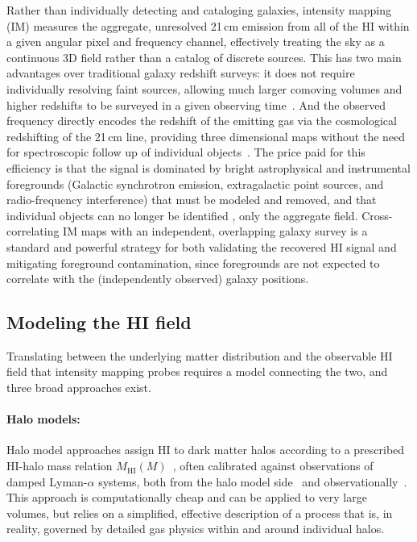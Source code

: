 Rather than individually detecting and cataloging galaxies, intensity mapping (IM) measures the aggregate, unresolved 21\,cm emission from all of the HI within a given angular pixel and frequency channel, effectively treating the sky as a continuous 3D field rather than a catalog of discrete sources. This has two main advantages over traditional galaxy redshift surveys: it does not require individually resolving faint sources, allowing much larger comoving volumes and higher redshifts to be surveyed in a given observing time~\citep{Villaescusa-Navarro:2018}. And the observed frequency directly encodes the redshift of the emitting gas via the cosmological redshifting of the 21\,cm line, providing three dimensional maps without the need for spectroscopic follow up of individual objects~\citep[e.g.][]{Bharadwaj:2000,Battye:2004,Chang:2007}. The price paid for this efficiency is that the signal is dominated by bright astrophysical and instrumental foregrounds (Galactic synchrotron emission, extragalactic point sources, and radio-frequency interference) that must be modeled and removed, and that individual objects can no longer be identified , only the aggregate field. Cross-correlating IM maps with an independent, overlapping galaxy survey is a standard and powerful strategy for both validating the recovered HI signal and mitigating foreground contamination, since foregrounds are not expected to correlate with the (independently observed) galaxy positions.

\subsection{Modeling the HI field}
\label{sec:modeling_hi}

Translating between the underlying matter distribution and the observable HI field that intensity mapping probes requires a model connecting the two, and three broad approaches exist.

\paragraph{Halo models:} Halo model approaches assign HI to dark matter halos according to a prescribed HI-halo mass relation $M_\text{HI}(M)$~\citep{padmanabhan_hi_2023}, often calibrated against observations of damped Lyman-$\alpha$ systems, both from the halo model side~\citep{Padmanabhan_2016} and observationally~\citep{Dev_2023,Obuljen_2019}. This approach is computationally cheap and can be applied to very large volumes, but relies on a simplified, effective description of a process that is, in reality, governed by detailed gas physics within and around individual halos.

